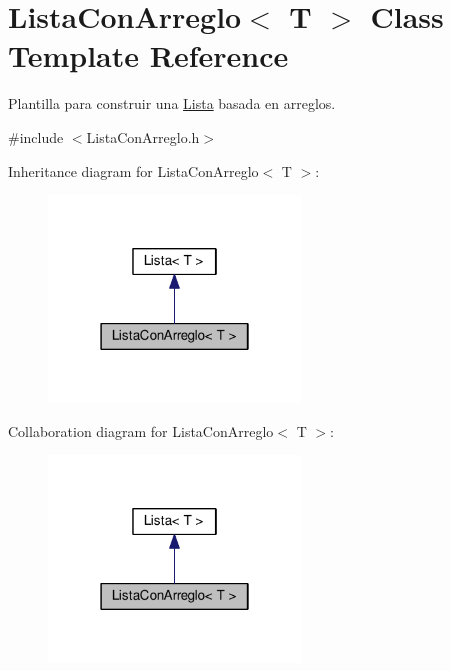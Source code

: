 \hypertarget{class_lista_con_arreglo}{}\section{Lista\+Con\+Arreglo$<$ T $>$ Class Template Reference}
\label{class_lista_con_arreglo}


Plantilla para construir una \hyperlink{class_lista}{Lista} basada en arreglos.  




{\ttfamily \#include $<$Lista\+Con\+Arreglo.\+h$>$}



Inheritance diagram for Lista\+Con\+Arreglo$<$ T $>$\+:\nopagebreak
\begin{figure}[H]
\begin{center}
\leavevmode
\includegraphics[width=190pt]{class_lista_con_arreglo__inherit__graph}
\end{center}
\end{figure}


Collaboration diagram for Lista\+Con\+Arreglo$<$ T $>$\+:\nopagebreak
\begin{figure}[H]
\begin{center}
\leavevmode
\includegraphics[width=190pt]{class_lista_con_arreglo__coll__graph}
\end{center}
\end{figure}
